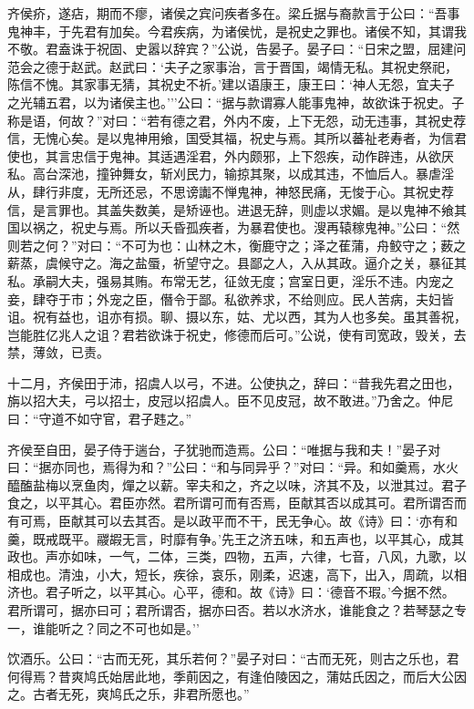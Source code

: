 \documentclass[]{article}
\begin{document}
齐侯疥，遂痁，期而不瘳，诸侯之宾问疾者多在。梁丘据与裔款言于公曰：``吾事鬼神丰，于先君有加矣。今君疾病，为诸侯忧，是祝史之罪也。诸侯不知，其谓我不敬。君盍诛于祝固、史嚣以辞宾？''公说，告晏子。晏子曰：``日宋之盟，屈建问范会之德于赵武。赵武曰：`夫子之家事治，言于晋国，竭情无私。其祝史祭祀，陈信不愧。其家事无猜，其祝史不祈。'建以语康王，康王曰：`神人无怨，宜夫子之光辅五君，以为诸侯主也。'''公曰：``据与款谓寡人能事鬼神，故欲诛于祝史。子称是语，何故？''对曰：``若有德之君，外内不废，上下无怨，动无违事，其祝史荐信，无愧心矣。是以鬼神用飨，国受其福，祝史与焉。其所以蕃祉老寿者，为信君使也，其言忠信于鬼神。其适遇淫君，外内颇邪，上下怨疾，动作辟违，从欲厌私。高台深池，撞钟舞女，斩刈民力，输掠其聚，以成其违，不恤后人。暴虐淫从，肆行非度，无所还忌，不思谤讟不惮鬼神，神怒民痛，无悛于心。其祝史荐信，是言罪也。其盖失数美，是矫诬也。进退无辞，则虚以求媚。是以鬼神不飨其国以祸之，祝史与焉。所以夭昏孤疾者，为暴君使也。溲再辕稼鬼神。''公曰：``然则若之何？''对曰：``不可为也：山林之木，衡鹿守之；泽之萑蒲，舟鲛守之；薮之薪蒸，虞候守之。海之盐蜃，祈望守之。县鄙之人，入从其政。逼介之关，暴征其私。承嗣大夫，强易其贿。布常无艺，征敛无度；宫室日更，淫乐不违。内宠之妾，肆夺于市；外宠之臣，僭令于鄙。私欲养求，不给则应。民人苦病，夫妇皆诅。祝有益也，诅亦有损。聊、摄以东，姑、尤以西，其为人也多矣。虽其善祝，岂能胜亿兆人之诅？君若欲诛于祝史，修德而后可。''公说，使有司宽政，毁关，去禁，薄敛，已责。

十二月，齐侯田于沛，招虞人以弓，不进。公使执之，辞曰：``昔我先君之田也，旃以招大夫，弓以招士，皮冠以招虞人。臣不见皮冠，故不敢进。''乃舍之。仲尼曰：``守道不如守官，君子韪之。''

齐侯至自田，晏子侍于遄台，子犹驰而造焉。公曰：``唯据与我和夫！''晏子对曰：``据亦同也，焉得为和？''公曰：``和与同异乎？''对曰：``异。和如羹焉，水火醯醢盐梅以烹鱼肉，燀之以薪。宰夫和之，齐之以味，济其不及，以泄其过。君子食之，以平其心。君臣亦然。君所谓可而有否焉，臣献其否以成其可。君所谓否而有可焉，臣献其可以去其否。是以政平而不干，民无争心。故《诗》曰：`亦有和羹，既戒既平。鬷嘏无言，时靡有争。'先王之济五味，和五声也，以平其心，成其政也。声亦如味，一气，二体，三类，四物，五声，六律，七音，八风，九歌，以相成也。清浊，小大，短长，疾徐，哀乐，刚柔，迟速，高下，出入，周疏，以相济也。君子听之，以平其心。心平，德和。故《诗》曰：`德音不瑕。'今据不然。君所谓可，据亦曰可；君所谓否，据亦曰否。若以水济水，谁能食之？若琴瑟之专一，谁能听之？同之不可也如是。''

饮酒乐。公曰：``古而无死，其乐若何？''晏子对曰：``古而无死，则古之乐也，君何得焉？昔爽鸠氏始居此地，季萴因之，有逢伯陵因之，蒲姑氏因之，而后大公因之。古者无死，爽鸠氏之乐，非君所愿也。''
\end{document}
